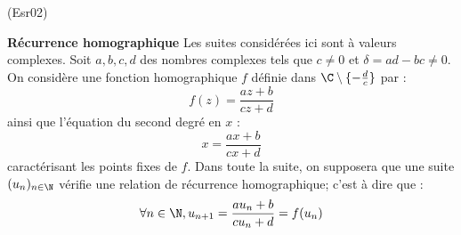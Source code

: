 \begin{tiny}(Esr02)\end{tiny}
\textbf{R{\'e}currence homographique}\newline
Les suites consid{\'e}r{\'e}es ici sont à valeurs complexes.\newline
Soit $a,b,c,d$ des nombres complexes tels que $c\neq 0$ et $\delta = ad-bc\neq 0$. On consid{\`e}re une fonction homographique $f$ définie dans $\C\setminus\{-\frac{d}{c}\}$ par :
\begin{displaymath}
 f(z) = \frac{az+b}{cz+d}
\end{displaymath}
ainsi que l'{\'e}quation du second degr{\'e} en $x$ :
\begin{equation}
x=\frac{ax+b}{cx+d}  \tag{E}
\end{equation}
caractérisant les points fixes de $f$.
Dans toute la suite, on supposera que une suite $(u_n)_{n\in \N}$ v{\'e}rifie une relation de r{\'e}currence homographique; c'est {\`a} dire que :
\[
\forall n\in \N, u_{n+1}=\frac{au_n+b}{cu_n+d}=f(u_n)
\]
